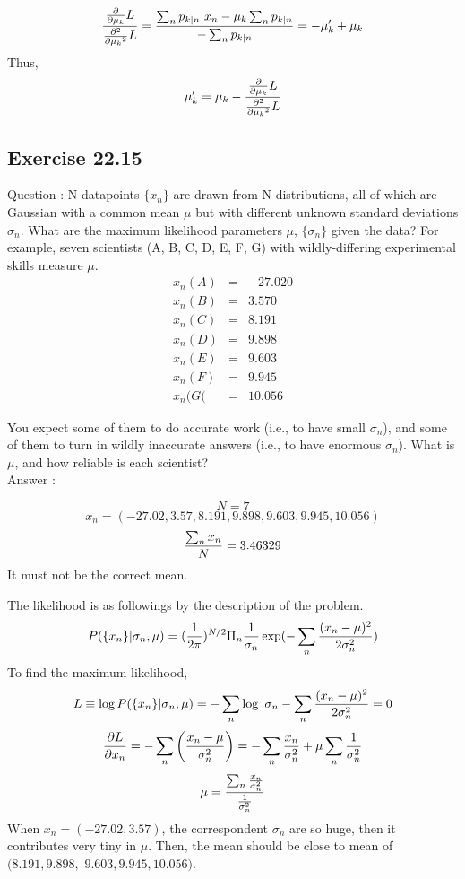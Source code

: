 \documentclass[a4paper,11pt]{article}
\numberwithin{equation}{section}
\begin{document}
{$$
{{\partial \over \partial{\mu_k}}L \over {\partial^2 \over \partial{\mu_k}^2}L  } = {\sum_n p_{k|n} ~x_n -  \mu_k\sum_n p_{k|n} \over -\sum_n p_{k|n}}= -\mu'_k+\mu_k
$$
Thus, 
$$
\mu'_k=\mu_k-{{\partial \over \partial{\mu_k}}L \over {\partial^2 \over \partial{\mu_k}^2}L  }
$$

\subsection{Exercise 22.15}

Question : N datapoints $\{x_n\}$ are drawn from
N distributions, all of which are Gaussian with a common mean $\mu$ but
with different unknown standard deviations $\sigma_n$. What are the maximum
likelihood parameters $\mu$, $\{\sigma_n\}$ given the data? For example, seven scientists (A, B, C, D, E, F, G) with wildly-differing experimental skills
measure $\mu$.
\begin{eqnarray*}
x_n(A) &=& -27.020\\
x_n(B) &=& 3.570\\
x_n(C) &=& 8.191\\
x_n(D) &=& 9.898\\
x_n(E) &=& 9.603\\
x_n(F) &=& 9.945\\
x_n(G( &=& 10.056
\end{eqnarray*}


You expect some of them to do accurate work (i.e., to have
small $\sigma_n$), and some of them to turn in wildly inaccurate answers (i.e.,
to have enormous $\sigma_n$). What is $\mu$, and how reliable is each scientist?
$$
$$
Answer :

$$
N=7
$$
$$
x_n=(-27.02, 3.57, 8.191, 9.898, 9.603, 9.945, 10.056)
$$
$$
{\sum_n x_n\over N}=3.46329
$$
It must not be the correct mean. 

The likelihood is as followings by the description of the problem. 
$$
P(\{x_n\}|\sigma_n,\mu) = ({1 \over 2\pi })^{N/2} \Pi_n{1\over \sigma_n } \exp(-\sum_n {(x_n-\mu)^2 \over 2\sigma^2_n})
$$ 
To find the maximum likelihood,
$$
L \equiv \log P(\{x_n\}|\sigma_n,\mu) = -\sum_n \log~\sigma_n-\sum_n {(x_n -\mu)^2 \over 2\sigma_n^2} =0 
$$
$$
{\partial L \over \partial x_n} = -\sum_n \left({x_n-\mu \over \sigma^2_n}\right)=-\sum_n{x_n \over \sigma_n^2}+\mu\sum_n {1 \over \sigma_n^2}
$$
$$
\mu= {\sum_n{x_n\over \sigma_n^2}\over{1\over \sigma_n^2}}
$$
When $x_n=(-27.02, 3.57)$, the correspondent $\sigma_n$ are so huge, then it contributes very tiny in $\mu$. Then, the mean should be close to mean of $(8.191, 9.898,$ 
$9.603, 9.945, 10.056)$.


}
\end{document}
